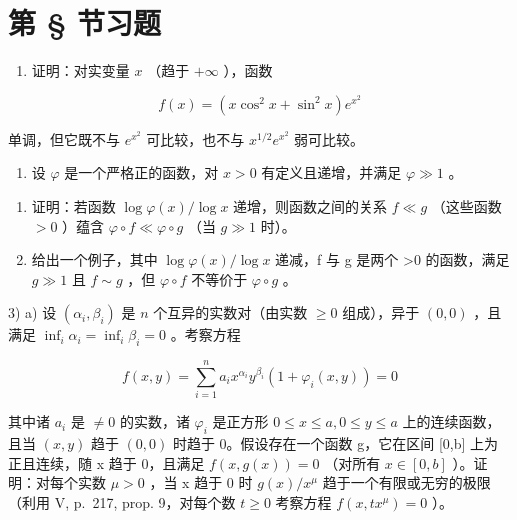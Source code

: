 \section*{第 \S{} 节习题}
{}

\begin{enumerate}
\def\labelenumi{\arabic{enumi})}
\tightlist
\item
  证明：对实变量 \(x\) （趋于 \(+\infty\) ），函数
\end{enumerate}

\[
f (x) = \left(x \cos^ {2} x + \sin^ {2} x\right) e ^ {x ^ {2}}
\]

单调，但它既不与 \(e^{x^2}\) 可比较，也不与 \(x^{1/2}e^{x^2}\) 弱可比较。

\begin{enumerate}
\def\labelenumi{\arabic{enumi})}
\setcounter{enumi}{1}
\tightlist
\item
  设 \(\varphi\) 是一个严格正的函数，对 \(x > 0\) 有定义且递增，并满足 \(\varphi \gg 1\) 。
\end{enumerate}

\begin{enumerate}
\def\labelenumi{\alph{enumi})}
\item
  证明：若函数 \(\log \varphi(x) / \log x\) 递增，则函数之间的关系 \(f \ll g\) （这些函数 \(>0\) ）蕴含 \(\varphi \circ f \ll \varphi \circ g\) （当 \(g \gg 1\) 时）。
\item
  给出一个例子，其中 \(\log \varphi(x)/\log x\) 递减，f 与 g 是两个 \textgreater0 的函数，满足 \(g \gg 1\) 且 \(f \sim g\) ，但 \(\varphi \circ f\) 不等价于 \(\varphi \circ g\) 。
\end{enumerate}

3) a) 设 \((\alpha_{i},\beta_{i})\) 是 \(n\) 个互异的实数对（由实数 \(\geqslant 0\) 组成），异于 \((0,0)\) ，且满足 \(\inf_{i}\alpha_{i} = \inf_{i}\beta_{i} = 0\) 。考察方程

\[
f (x, y) = \sum_ {i = 1} ^ {n} a _ {i} x ^ {\alpha_ {i}} y ^ {\beta_ {i}} \left(1 + \varphi_ {i} (x, y)\right) = 0
\]

其中诸 \(a_{i}\) 是 \(\neq0\) 的实数，诸 \(\varphi_{i}\) 是正方形 \(0\leqslant x\leqslant a,0\leqslant y\leqslant a\) 上的连续函数，且当 \((x,y)\) 趋于 \((0,0)\) 时趋于 0。假设存在一个函数 g，它在区间 {[}0,b{]} 上为正且连续，随 x 趋于 0，且满足 \(f(x,g(x))=0\) （对所有 \(x\in[0,b]\) ）。证明：对每个实数 \(\mu>0\) ，当 x 趋于 0 时 \(g(x)/x^{\mu}\) 趋于一个有限或无穷的极限（利用 V, p.~217, prop. 9，对每个数 \(t\geqslant0\) 考察方程 \(f(x,tx^{\mu})=0\) ）。

